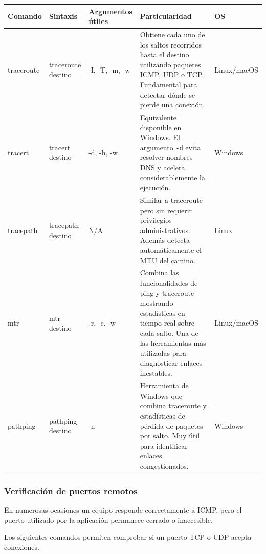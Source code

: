 \documentclass[a4paper,10pt]{article}
\begin{document}
\begin{longtable}{|p{2.8cm}|p{3cm}|p{4cm}|p{5.6cm}|p{1.5cm}|}

\hline
Comando &
Sintaxis &
Argumentos útiles &
Particularidad &
OS
\\
\hline
\endhead

traceroute &
traceroute destino &
-I, -T, -m, -w &
Obtiene cada uno de los saltos recorridos hasta el destino utilizando paquetes ICMP, UDP o TCP. Fundamental para detectar dónde se pierde una conexión. &
Linux/macOS
\\
\hline

tracert &
tracert destino &
-d, -h, -w &
Equivalente disponible en Windows. El argumento \texttt{-d} evita resolver nombres DNS y acelera considerablemente la ejecución. &
Windows
\\
\hline

tracepath &
tracepath destino &
N/A &
Similar a traceroute pero sin requerir privilegios administrativos. Además detecta automáticamente el MTU del camino. &
Linux
\\
\hline

mtr &
mtr destino &
-r, -c, -w &
Combina las funcionalidades de ping y traceroute mostrando estadísticas en tiempo real sobre cada salto. Una de las herramientas más utilizadas para diagnosticar enlaces inestables. &
Linux/macOS
\\
\hline

pathping &
pathping destino &
-n &
Herramienta de Windows que combina traceroute y estadísticas de pérdida de paquetes por salto. Muy útil para identificar enlaces congestionados. &
Windows
\\
\hline

\end{longtable}




\subsubsection{Verificación de puertos remotos}

En numerosas ocasiones un equipo responde correctamente a ICMP, pero el puerto
utilizado por la aplicación permanece cerrado o inaccesible.

Los siguientes comandos permiten comprobar si un puerto TCP o UDP acepta
conexiones.
\end{document}
